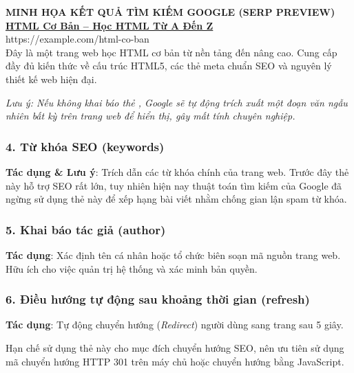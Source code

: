 \begin{tcolorbox}[
    enhanced,
    width=\linewidth,
    colback=white,
    colframe=codeBorder,
    arc=6pt,
    boxrule=0.8pt,
    top=10pt, bottom=10pt, left=14pt, right=14pt,
    drop shadow=black!3!white
]
{\sffamily\bfseries\scriptsize\color{codeComment} MINH HỌA KẾT QUẢ TÌM KIẾM GOOGLE (SERP PREVIEW)}\\[4pt]
{\sffamily\bfseries\Large\color{primaryBlue} \underline{HTML Cơ Bản -- Học HTML Từ A Đến Z}}\\[3pt]
{\sffamily\small\color{codeString} https://example.com/html-co-ban}\\[6pt]
{\sffamily\small\color{darkText} Đây là một trang web học HTML cơ bản từ nền tảng đến nâng cao. Cung cấp đầy đủ kiến thức về cấu trúc HTML5, các thẻ meta chuẩn SEO và nguyên lý thiết kế web hiện đại.}
\end{tcolorbox}

\textit{Lưu ý: Nếu không khai báo thẻ , Google sẽ tự động trích xuất một đoạn văn ngẫu nhiên bất kỳ trên trang web để hiển thị, gây mất tính chuyên nghiệp.}

\subsubsection{4. Từ khóa SEO (keywords)}
\begin{center}
\end{center}
\textbf{Tác dụng \& Lưu ý}: Trích dẫn các từ khóa chính của trang web. Trước đây thẻ này hỗ trợ SEO rất lớn, tuy nhiên hiện nay thuật toán tìm kiếm của Google đã ngừng sử dụng thẻ này để xếp hạng bài viết nhằm chống gian lận spam từ khóa.

\subsubsection{5. Khai báo tác giả (author)}
\begin{center}
\end{center}
\textbf{Tác dụng}: Xác định tên cá nhân hoặc tổ chức biên soạn mã nguồn trang web. Hữu ích cho việc quản trị hệ thống và xác minh bản quyền.

\subsubsection{6. Điều hướng tự động sau khoảng thời gian (refresh)}
\begin{center}
\end{center}
\textbf{Tác dụng}: Tự động chuyển hướng (\textit{Redirect}) người dùng sang trang  sau 5 giây. 
\begin{warnBox}
Hạn chế sử dụng thẻ này cho mục đích chuyển hướng SEO, nên ưu tiên sử dụng mã chuyển hướng HTTP 301 trên máy chủ hoặc chuyển hướng bằng JavaScript.
\end{warnBox}

